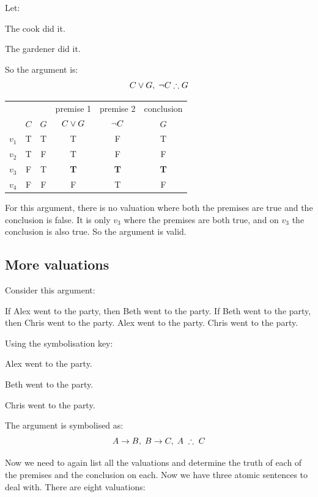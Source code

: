 Let:
\begin{ekey}
	\item[C]The cook did it.
	\item[G] The gardener did it.
\end{ekey}

So the argument is:
\[
	C \eor G, \;\enot C \therefore G
\]

\begin{center}
	\begin{tabular}{rcc|c|c|c}
		&&&premise 1&premise 2&conclusion\\
		&$C$&$G$&$C\vee G$&$\neg C$&$G$\\\hline
		$v_1$&T&T&T&F&T\\
		$v_2$&T&F&T&F&F\\
		$v_3$&F&T&\textbf{T}&\textbf{T}&\textbf{T}\\
		$v_4$&F&F&F&T&F\\
	\end{tabular}
\end{center}

For this argument, there is no valuation where both the premises are true and the conclusion is false. It is only $v_3$ where the premises are both true, and on $v_3$ the conclusion is also true. So the argument is valid. 

\subsection{More valuations}

Consider this argument:
\begin{earg}
	\prem If Alex went to the party, then Beth went to the party.
	\prem If Beth went to the party, then Chris went to the party.
	\prem Alex went to the party.
	\conc Chris went to the party.
\end{earg}

Using the symbolisation key:
\begin{ekey}
	\item[A] Alex went to the party.
	\item[B] Beth went to the party.
	\item[C] Chris went to the party.
\end{ekey}

The argument is symbolised as:
\[
	A \eif B,\; B \eif C,\; A \;\therefore\; C
\]

Now we need to again list all the valuations and determine the truth of each of the premises and the conclusion on each. Now we have three atomic sentences to deal with. 
There are eight valuations:


